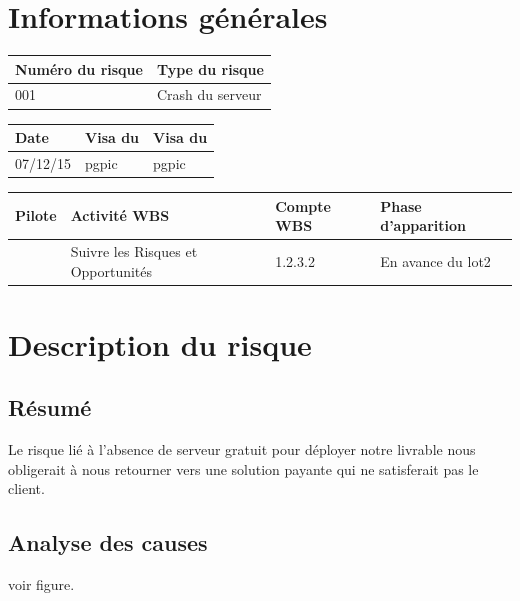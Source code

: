 \section*{Informations générales}
 
\begin{table}[H]
\centering
	\begin{tabularx}{16.8cm}{|X|X|}
	\hline
	\rowcolor{gray!40} Numéro du risque & Type du risque \\
	\hline
	001 & Crash du serveur \\
	\hline
	\end{tabularx}
\end{table}

\begin{table}[H]
\centering
	\begin{tabularx}{16.8cm}{|X|X|X|}
	\hline
	\rowcolor{gray!40} Date & Visa du \RQ & Visa du \CP \\
	\hline
	 07/12/15 & pgpic & pgpic \\
	\hline
	\end{tabularx}
\end{table}

\begin{table}[H]
\centering
	\begin{tabularx}{16.8cm}{|X|X|X|X|}
	\hline
	\rowcolor{gray!40} Pilote & Activité WBS & Compte WBS & Phase d'apparition \\
	\hline
	 \Matthieu & Suivre les Risques et Opportunités & 1.2.3.2 & En avance du lot2\\
	\hline
	\end{tabularx}
\end{table}

\section*{Description du risque}

\subsection*{Résumé}
	Le risque lié à l'absence de serveur gratuit pour déployer notre livrable nous obligerait à nous retourner vers une solution payante qui ne satisferait pas le client.
	
\subsection*{Analyse des causes}
	voir figure.


